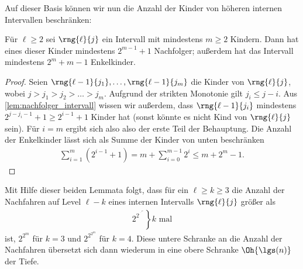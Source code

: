Auf dieser Basis können wir nun die Anzahl der Kinder von höheren internen Intervallen beschränken:
\begin{lemma}
    Für $\ell \ge 2$ sei $\rng{\ell}{j}$ ein Intervall mit mindestens $m \ge 2$ Kindern.
    Dann hat eines dieser Kinder mindestens $2^{m-1}+1$ Nachfolger; außerdem hat das Intervall mindestens $2^m + m - 1$ Enkelkinder.
\end{lemma}
\begin{proof}
    Seien $\rng{\ell - 1}{j_1}, \ldots, \rng{\ell - 1}{j_m}$ die Kinder von $\rng{\ell}{j}$, wobei $j > j_1 > j_2 > \ldots > j_m$.
    Aufgrund der strikten Monotonie gilt $j_i \le j - i$.
    Aus \cref{lem:nachfolger_intervall} wissen wir außerdem, dass $\rng{\ell-1}{j_i}$ mindestens $2^{j - j_i - 1} + 1 \ge 2^{i-1} + 1$ Kinder hat (sonst könnte es nicht Kind von $\rng{\ell}{j}$ sein).
    Für $i = m$ ergibt sich also also der erste Teil der Behauptung.
    Die Anzahl der Enkelkinder lässt sich als Summe der Kinder von unten beschränken
    \begin{align}
        \sum_{i=1}^m (2^{i-1} + 1) = m + \sum_{i=0}^{m-1} 2^i \le m + 2^m - 1.
    \end{align}
\end{proof}

Mit Hilfe dieser beiden Lemmata folgt, dass für ein $\ell \ge k \ge 3$ die Anzahl der Nachfahren auf Level $\ell -k$ eines internen Intervalls $\rng{\ell}{j}$ größer als
\def\rddots#1{\cdot^{\cdot^{\cdot^{#1}}}}
\begin{align}
    \left. 2^{2^{\rddots{2^m}}} \right\} \text{$k$ mal}
\end{align}
ist, \dh $2^{2^m}$ für $k=3$ und $2^{2^{2^m}}$ für $k=4$.
Diese untere Schranke an die Anzahl der Nachfahren übersetzt sich dann wiederum in eine obere Schranke $\Oh{\lgs(n)}$ der Tiefe.